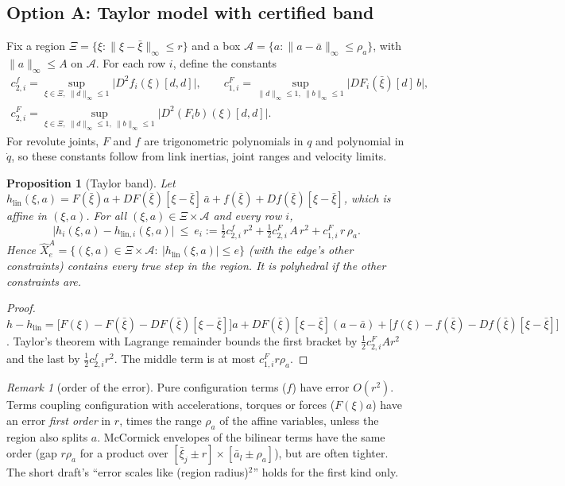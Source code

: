 \documentclass[11pt]{article}
\theoremstyle{plain}
\newtheorem{proposition}[theorem]{Proposition}
\theoremstyle{definition}
\theoremstyle{remark}
\newtheorem{remark}[theorem]{Remark}
\begin{document}
\subsection{Option A: Taylor model with certified band}\label{sec:optA}
Fix a region $\Xi=\{\xi:\|\xi-\bar\xi\|_\infty\le r\}$ and a box $\mathcal A=\{a:\|a-\bar a\|_\infty\le\rho_a\}$, with $\|a\|_\infty\le A$ on $\mathcal A$. For each row $i$, define the constants
\begin{gather*}
c^{f}_{2,i}=\sup_{\xi\in\Xi,\ \|d\|_\infty\le1}\big|D^2f_i(\xi)[d,d]\big|,\qquad
c^{F}_{1,i}=\sup_{\|d\|_\infty\le1,\ \|b\|_\infty\le1}\big|DF_i(\bar\xi)[d]\,b\big|,\\
c^{F}_{2,i}=\sup_{\xi\in\Xi,\ \|d\|_\infty\le1,\ \|b\|_\infty\le1}\big|D^2(F_ib)(\xi)[d,d]\big| .
\end{gather*}
For revolute joints, $F$ and $f$ are trigonometric polynomials in $q$ and polynomial in $\dot q$, so these constants follow from link inertias, joint ranges and velocity limits.

\begin{proposition}[Taylor band]\label{prop:taylor}
Let $h_{\mathrm{lin}}(\xi,a)=F(\bar\xi)a+DF(\bar\xi)[\xi-\bar\xi]\,\bar a+f(\bar\xi)+Df(\bar\xi)[\xi-\bar\xi]$, which is affine in $(\xi,a)$. For all $(\xi,a)\in\Xi\times\mathcal A$ and every row $i$,
\[
\big|h_i(\xi,a)-h_{\mathrm{lin},i}(\xi,a)\big|\ \le\ e_i:=\tfrac12c^f_{2,i}\,r^2+\tfrac12c^F_{2,i}\,A\,r^2+c^F_{1,i}\,r\,\rho_a .
\]
Hence $\hat X^A_e=\{(\xi,a)\in\Xi\times\mathcal A:\ |h_{\mathrm{lin}}(\xi,a)|\le e\}$ (with the edge's other constraints) contains every true step in the region. It is polyhedral if the other constraints are.
\end{proposition}
\begin{proof}
$h-h_{\mathrm{lin}}=\big[F(\xi)-F(\bar\xi)-DF(\bar\xi)[\xi-\bar\xi]\big]a+DF(\bar\xi)[\xi-\bar\xi](a-\bar a)+\big[f(\xi)-f(\bar\xi)-Df(\bar\xi)[\xi-\bar\xi]\big]$. Taylor's theorem with Lagrange remainder bounds the first bracket by $\tfrac12c^F_{2,i}Ar^2$ and the last by $\tfrac12c^f_{2,i}r^2$. The middle term is at most $c^F_{1,i}r\rho_a$.
\end{proof}

\begin{remark}[order of the error]\label{rem:order}
Pure configuration terms ($f$) have error $O(r^2)$. Terms coupling configuration with accelerations, torques or forces ($F(\xi)a$) have an error \emph{first order} in $r$, times the range $\rho_a$ of the affine variables, unless the region also splits $a$. McCormick envelopes of the bilinear terms have the same order (gap $r\rho_a$ for a product over $[\bar\xi_j\pm r]\times[\bar a_l\pm\rho_a]$), but are often tighter. The short draft's ``error scales like (region radius)$^2$'' holds for the first kind only.
\end{remark}
\end{document}
